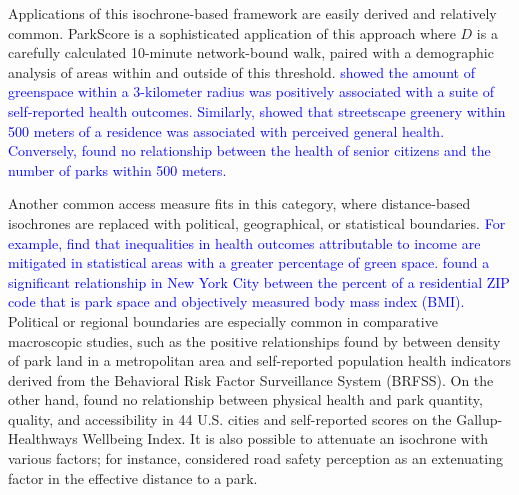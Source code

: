 \documentclass[shortAfour,sageh.bst]{sagej}
\begin{document}
Applications of this isochrone-based framework are easily derived and
relatively common. ParkScore \citep{parkscore2019} is a sophisticated
application of this approach where \(D\) is a carefully calculated
10-minute network-bound walk, paired with a demographic analysis of
areas within and outside of this threshold. \textcolor{blue}{\citet{devries2003natural}
showed the amount of greenspace within a 3-kilometer radius was
positively associated with a suite of self-reported health outcomes.
Similarly, \citet{devries2013streetscape} showed that streetscape
greenery within 500 meters of a residence was associated with perceived
general health. Conversely, \citet{carlson2012interactions} found no
relationship between the health of senior citizens and the number of
parks within 500 meters.}

Another common access measure fits in this category, where
distance-based isochrones are replaced with political, geographical, or
statistical boundaries. \textcolor{blue}{For example, \citet{Mitchell2008} find that inequalities
in health outcomes attributable to income are mitigated in statistical areas
with a greater percentage of green space. \citet{Stark2014} found a significant
relationship in New York City between the percent of a residential ZIP code that
is park space and objectively measured body mass index (BMI).} Political or
regional boundaries are
especially common in comparative macroscopic studies, such as the
positive relationships found by \citet{West2012} between density of park
land in a metropolitan area and self-reported population health
indicators derived from the Behavioral Risk Factor Surveillance System
(BRFSS). On the other hand, \citet{Larson2016} found no relationship
between physical health and park quantity, quality, and accessibility in
44 U.S. cities and self-reported scores on the Gallup-Healthways
Wellbeing Index. It is also possible to attenuate an isochrone with
various factors; for instance, \citet{Dias2019} considered road safety
perception as an extenuating factor in the effective distance to a park.
\end{document}
